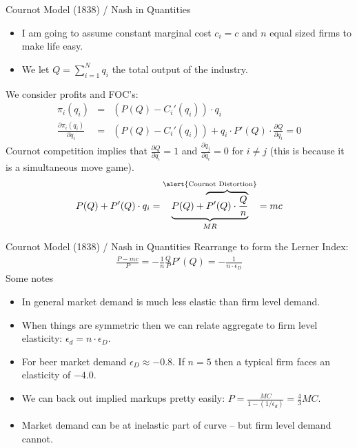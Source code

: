 \documentclass[xcolor=pdftex,dvipsnames,table,mathserif,aspectratio=169]{beamer}
\begin{document}
\begin{frame}{Cournot Model (1838) / Nash in Quantities}
\begin{itemize}
\item I am going to assume constant marginal cost $c_i = c$ and $n$ equal sized firms to make life easy. 
\item We let $Q=\sum_{i=1}^N q_i$ the total output of the industry.
\end{itemize}
We consider profits and FOC's:
\begin{eqnarray*}
\pi_i(q_i) &=& (P(Q) - C_i'(q_i) ) \cdot q_i\\
\frac{\partial \pi_i(q_i)}{\partial q_i} &=& (P(Q) - C_i'(q_i))  +  q_i  \cdot P'(Q) \cdot \frac{\partial Q}{\partial q_i}  = 0
\end{eqnarray*}
Cournot competition implies that $\frac{\partial Q}{\partial q_i} = 1$ and $\frac{\partial q_j}{\partial q_i} = 0$ for $i \neq j$ (this is because it is a simultaneous move game).
\begin{eqnarray*}
P(Q) + P'(Q) \cdot q_i = \underbrace{P(Q) + \overbrace{P'(Q) \cdot \frac{Q}{n}}}^{\text{\alert{Cournot Distortion}}}_{MR} =  mc
\end{eqnarray*}
\end{frame}

\begin{frame}{Cournot Model (1838) / Nash in Quantities}
Rearrange to form the Lerner Index:
\begin{eqnarray*}
\frac{P-mc}{P} = - \frac{1}{n} \frac{Q}{P} P'(Q) = - \frac{1}{n \cdot \epsilon_D}
\end{eqnarray*}
Some notes
\begin{itemize}
\item In general market demand is much less elastic than firm level demand.
\item When things are symmetric then we can relate aggregate to firm level elasticity: $\epsilon_d = n \cdot \epsilon_D$.
\item For beer market demand $\epsilon_D \approx -0.8$. If $n=5$ then a typical firm faces an elasticity of $-4.0$.
\item We can back out implied markups pretty easily: $P  = \frac{MC}{1-(1/\epsilon_d)}  = \frac{4}{3} MC$.
\item Market demand can be at inelastic part of curve -- but firm level demand cannot.
\end{itemize}
\end{frame}
\end{document}
